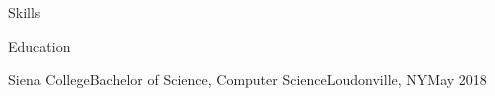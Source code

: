 \documentclass[]{xjavathehutt}
\begin{document}
\begin{cvsection}{Skills}
  \printskills
\end{cvsection}


\begin{cvsection}{Education}
  \begin{cveducation}{Siena College}{Bachelor of Science, Computer Science}{Loudonville, NY}{May 2018}
  \end{cveducation}
\end{cvsection}


\end{document}

